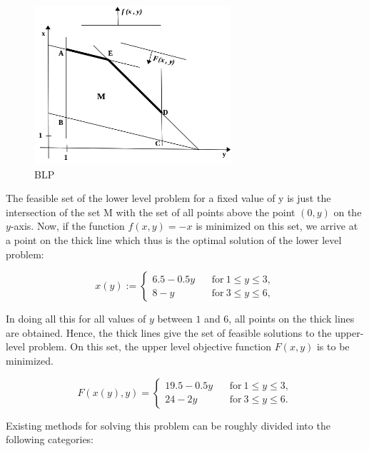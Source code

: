 \documentclass[a4paper, 12pt]{article}
\begin{document}
\begin{figure}[h]
\centering
\includegraphics[width=0.65\textwidth, clip]{./blp.jpg}
\vspace{-0.15in}
\caption{BLP}
\label{fig:2}
\end{figure}
\noindent
The feasible set of the lower level problem for a fixed value of y is just the intersection of the set M with the set of all points above the point $\left(0,y\right)$ on the $y$-axis. Now, if the function $f \left(x,y\right) = -x$ is minimized on this set, we arrive at a point on the thick line which thus is the optimal solution of the lower level problem:\\
\begin{large}
\[
 x(y) := 
  \begin{cases} 
   6.5-0.5y\ \ \ \ &\text{for}\ 1\leq{y}\leq3,\\
   8-y\ \ \ \ &\text{for}\ 3\leq{y}\leq6,
  \end{cases}
\]
\end{large}
\noindent
In doing all this for all values of $y$ between $1$ and $6$, all points on the thick lines are obtained. Hence, the thick lines give the set of feasible solutions to the upper-level problem. On this set, the upper level objective function $F\left(x,y\right)$ is to be minimized.
\begin{large}
\[
 F(x(y),y) = 
  \begin{cases}
   19.5-0.5y\ \ \ \ &\text{for}\ 1\leq{y}\leq3,\\
   24-2y\ \ \ \ &\text{for}\ 3\leq{y}\leq{6}.
  \end{cases}
\]
\end{large}
\noindent
Existing methods for solving this problem can be roughly divided into the following categories:
\end{document}
